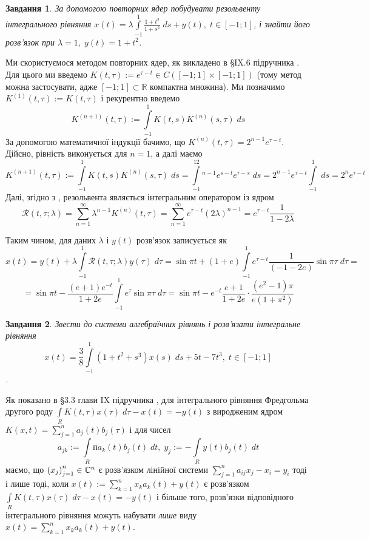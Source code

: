 \documentclass[10pt]{article}
\newtheorem{prob}{Завдання}
\newcommand{\ds}{\;ds}
\newcommand{\dt}{\;dt}
\let\oldint\int
\renewcommand{\int}{\oldint\limits}
\begin{document}
\begin{prob}За допомогою повторних ядер побудувати резольвенту інтегрального рівняння $x(t)=\lambda
	\int_{-1}^{1}\frac{1+t^2}{1+s^2}\ds+
	y(t),\;t\in[-1;1]$, і знайти його розв’язок при $\lambda=1,\;y(t)=1+t^2$.\end{prob}
	Ми скористуємося методом повторних ядер, як викладено в \S IX.6 підручника
	\cite{tb}. Для цього ми введемо $K(t,\tau):=e^{\tau-t}\in
	C([-1;1]\times[-1;1])$ (тому метод можна застосувати, адже $[-1;1]\subset\mathbb{R}$
	компактна множина). Ми позначимо $K^{(1)}(t,
	\tau):=K(t,\tau)$ і рекурентно введемо
	\[K^{(n+1)}(t,\tau):=\int_{-1}^1 K(t,s)K^{(n)}(s,\tau)\ds\]
	За допомогою математичної індукції бачимо, що $K^{(n)}(t,\tau)=2^{n-1}e^{\tau-t}$. Дійсно, рівність виконується для
	$n=1$, а далі маємо
	\[K^{(n+1)}(t,\tau):=\int
	_{-1}^1 K(t,s)K^{(n)}(s,\tau)\ds=\int_{-1}^12^{n-1}e^{s-t}e^{\tau-s}\ds=2^{n-1}e^{\tau-t}\int_{-1}^1\ds=2^ne^{\tau-t}\]
	Далі, згідно з \cite{tb}, резольвента являється інтегральним оператором із ядром
	\[\mathcal{R}(t,\tau;\lambda)=\sum_{n=1}^\infty \lambda^{n-1}K^{(n)}(t,\tau)=\sum_{n=1}^\infty e^{\tau-t}(2\lambda)^{n-1}
	=e^{\tau-t}\frac{1}{1-2\lambda}\]

	Таким чином, для даних $\lambda$ і $y(t)$ розв’язок записується як
	\[x(t)=y(t)+\lambda\int_{-1}^1\mathcal{R}(t,\tau;\lambda)y(\tau)\;d\tau=\sin\pi t+(1+e)\int_{-1}^1e^{\tau-t}\frac{1}{(-1-2e)}
	\sin\pi\tau\;d\tau=\]
	\[=\sin\pi t-\frac{(e+1)e^{-t}}{1+2e}\int_{-1}^1e^\tau\sin\pi\tau\;d\tau=\sin\pi t-e^{-t}\frac{e+1}{1+2e}\cdot
	\frac{(e^2-1)\pi}{e(1+\pi^2)}\]
\begin{prob}Звести до системи алгебраїчних рівнянь і розв’язати інтегральне рівняння
	\[x(t)=\frac{3}{8}\int_{-1}^1(1+t^2+s^3)x(s)\ds+5t-7t^3,\;t\in[-1;1]\].
\end{prob}
Як показано в \S 3.3 глави IX підручника \cite{tb}, для інтегрального рівняння Фредгольма другого роду $\int_RK(t,\tau)x(\tau)\;d\tau
-x(t)=-y(t)$ з виродженим ядром $K(x,t)=\sum_{j=1}^n a_j(t)b_j(\tau)$ і для чисел
\[a_{jk}:=\int_Rпa_k(t)b_j(t)\dt,\;y_j:=-\int_Ry(t)b_j(t)\dt\]
маємо, що $\left(x_j\right)_{j=1}^n\in\mathbb{C}^n$ є розв’язком лінійної системи
$\sum_{j=1}^na_{ij}x_j-x_i=y_i$ тоді і лише тоді, коли $x(t):=\sum_{k=1}^nx_ka_k(t)+y(t)$ є розв’язком $\int_RK(t,\tau)x(\tau)\;d\tau
-x(t)=-y(t)$ і більше того,
розв’язки відповідного інтегрального рівняння можуть набувати {\it лише} виду $x(t)=\sum_{k=1}^nx_ka_k(t)+y(t)$.
\end{document}
